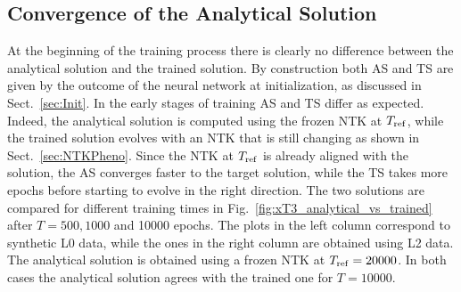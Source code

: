 \subsection{Convergence of the Analytical Solution}
\label{sec:CheckAnalyticalConvergence}

At the beginning of the training process there is clearly no difference between the analytical solution and
the trained solution. By construction both AS and TS are given by the outcome of the neural network at initialization, 
as discussed in Sect.~\ref{sec:Init}. In the early stages of training AS and TS differ as expected. Indeed, the
analytical solution is computed using the frozen NTK at $T_{\rm ref}$, while the trained solution evolves with an 
NTK that is still changing as shown in Sect.~\ref{sec:NTKPheno}. Since the NTK at $T_{\rm ref}$ is already aligned 
with the solution, the AS converges faster to the target solution, while the TS takes more epochs before starting 
to evolve in the right direction. The two solutions are compared for different training times in Fig.~\ref{fig:xT3_analytical_vs_trained}
after $T=500, 1000$ and 10000 epochs. The plots in the left column correspond to synthetic L0 data, while the ones 
in the right column are obtained using L2 data. The analytical solution is obtained using a frozen NTK 
at $T_{\rm ref}=20000$. In both cases the analytical solution agrees with the trained one for $T=10000$.

